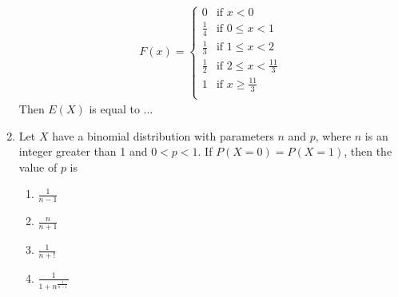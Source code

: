 \documentclass[journal,12pt,twocolumn]{IEEEtran}
\begin{document}
\begin{enumerate}
\begin{align}
F(x) = 
    \begin{cases} 
      0 & \text{if }x < 0 \\
      \frac{1}{4} & \text{if } 0\leq x < 1 \\
      \frac{1}{3} & \text{if } 1\leq x < 2 \\
      \frac{1}{2} & \text{if } 2\leq x < \frac{11}{3} \\
      1 & \text{if } x \geq \frac{11}{3} \\
   \end{cases}
\end{align}
Then $E(X)$ is equal to ...
%
\solution
  
%
\item Let $X$ have a binomial distribution with parameters $n$ and $p$, where $n$ is an integer greater than 1 and $0<p<1$. If $P(X=0)=P(X=1)$, then the value of $p$ is
\begin{enumerate}[label=(\Alph*)]
\setlength\itemsep{0.5em}
    \item $\frac{1}{n-1}$
    \item $\frac{n}{n+1}$
    \item $\frac{1}{n+!}$
    \item $\frac{1}{1+n^{\frac{1}{n-1}}}$
\end{enumerate}
%
\solution
  


\end{enumerate}
\end{document}
